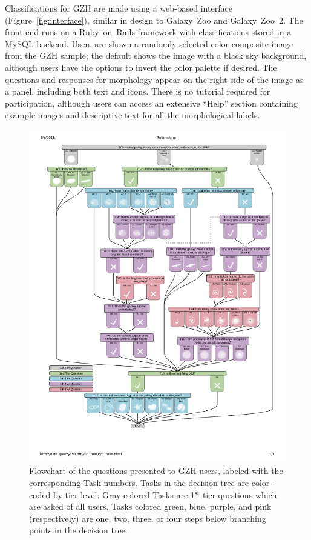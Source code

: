 \documentclass[twocolumn]{aastex6}
\begin{document}
Classifications for GZH are made using a web-based interface (Figure~\ref{fig:interface}), similar in design to Galaxy~Zoo and Galaxy~Zoo~2. The front-end runs on a Ruby~on~Rails framework with classifications stored in a MySQL backend. Users are shown a randomly-selected color composite image from the GZH sample; the default shows the image with a black sky background, although users have the options to invert the color palette if desired. The questions and responses for morphology appear on the right side of the image as a panel, including both text and icons. There is no tutorial required for participation, although users can access an extensive ``Help'' section containing example images and descriptive text for all the morphological labels. 

\begin{figure}
\center
\includegraphics[width=\textwidth]{figures/gzh_decision_tree.pdf}
\caption{Flowchart of the questions presented to GZH users, labeled with the corresponding Task numbers. Tasks in the decision tree are color-coded by tier level: Gray-colored Tasks are 1$^\mathrm{st}$-tier questions which are asked of all users. Tasks colored green, blue, purple, and pink (respectively) are one, two, three, or four steps below branching points in the decision tree.}
\label{fig:decisiontree}
\end{figure}
\end{document}
